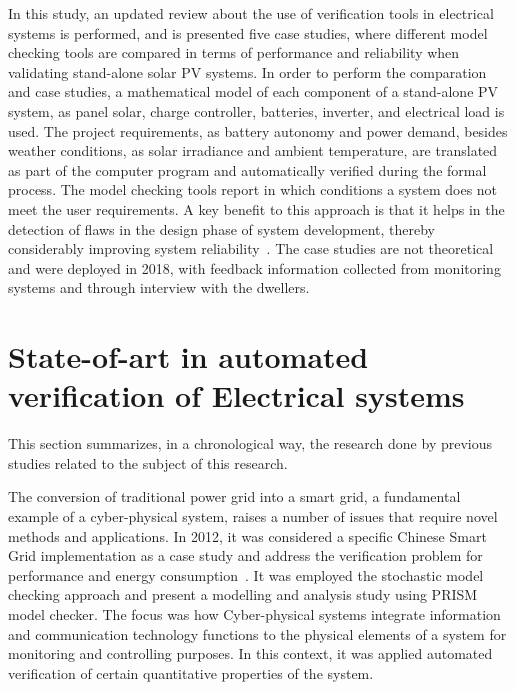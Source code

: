 \documentclass[runningheads]{llncs}
\begin{document}
In this study, an updated review about the use of verification tools in electrical systems is performed, and is presented five case studies, where different model checking tools are compared in terms of performance and reliability when validating stand-alone solar PV systems. In order to perform the comparation and case studies, a mathematical model of each component of a stand-alone PV system, as panel solar, charge controller, batteries, inverter, and electrical load is used. The project requirements, as battery autonomy and power demand, besides weather conditions, as solar irradiance and ambient temperature, are translated as part of the computer program and automatically verified during the formal process. The model checking tools report in which conditions a system does not meet the user requirements. A key benefit to this approach is that it helps in the detection of flaws in the design phase of system development, thereby considerably improving system reliability~\cite{Akram2018}. The case studies are not theoretical and were deployed in 2018, with feedback information collected from monitoring systems and through interview with the dwellers. 
\section{State-of-art in automated verification of Electrical systems}
This section summarizes, in a chronological way, the research done by previous studies related to the subject of this research.

The conversion of traditional power grid into a smart grid, a fundamental example of a cyber-physical system, raises a number of issues that require novel methods and applications. In 2012, it was considered a specific Chinese Smart Grid implementation as a case study and address the verification problem for performance and energy consumption~\cite{Yukseletall2012}. It was employed the stochastic model checking approach and present a modelling and analysis study using PRISM model checker. The focus was how Cyber-physical systems integrate information and communication technology functions to the physical elements of a system for monitoring and controlling purposes.  In this context, it was applied automated verification of certain quantitative properties of the system. %
\end{document}
